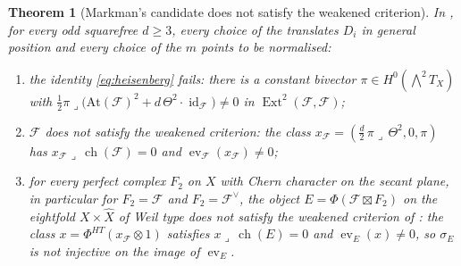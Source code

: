 \documentclass[11pt,reqno]{amsart}
\theoremstyle{plain}
\newtheorem{theorem}{Theorem}[section]
\theoremstyle{definition}
\theoremstyle{remark}
\newcommand{\cF}{\mathcal{F}}
\DeclareMathOperator{\ch}{ch}
\DeclareMathOperator{\Ext}{Ext}
\DeclareMathOperator{\id}{id}
\begin{document}
\begin{theorem}[Markman's candidate does not satisfy the weakened criterion]
\label{thm:candidatefails}
In , for every odd squarefree $d\ge3$, every choice of the
translates $D_{i}$ in general position and every choice of the $m$ points to
be normalised:
\begin{enumerate}[label=\textup{(\roman*)},nosep]
\item the identity \eqref{eq:heisenberg} fails: there is a constant bivector
  $\pi\in H^{0}(\bigwedge^{2}T_{X})$ with
  $\tfrac12\pi\lrcorner\bigl(\mathrm{At}(\cF)^{2}+d\,\Theta^{2}\cdot\id_{\cF}\bigr)\ne0$
  in $\Ext^{2}(\cF,\cF)$;
\item $\cF$ does not satisfy the weakened criterion: the class
  $x_{\cF}=(\tfrac d2\,\pi\lrcorner\,\Theta^{2},0,\pi)$ has
  $x_{\cF}\lrcorner\,\ch(\cF)=0$ and $\operatorname{ev}_{\cF}(x_{\cF})\ne0$;
\item for every perfect complex $F_{2}$ on $X$ with Chern character on the
  secant plane, in particular for $F_{2}=\cF$ and $F_{2}=\cF^{\vee}$, the
  object $E=\Phi(\cF\boxtimes F_{2})$ on the eightfold $X\times\widehat X$ of
  Weil type does not satisfy the weakened criterion of
  \cite[Question 11.4]{Mar25b}: the class $x=\Phi^{HT}(x_{\cF}\otimes1)$
  satisfies $x\lrcorner\,\ch(E)=0$ and $\operatorname{ev}_{E}(x)\ne0$, so
  $\sigma_{E}$ is not injective on the image of $\operatorname{ev}_{E}$.
\end{enumerate}
\end{theorem}
\end{document}
